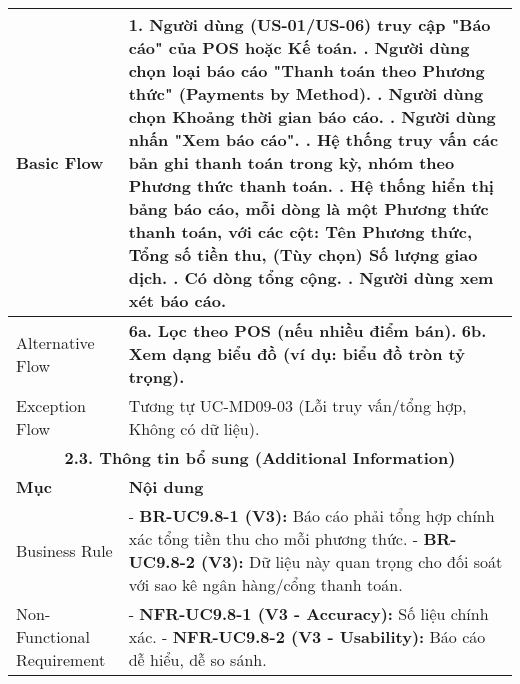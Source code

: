 \begin{longtable}{|m{4cm}|p{11cm}|}
Basic Flow & 1. Người dùng (US-01/US-06) truy cập "Báo cáo" của POS hoặc Kế toán. \newline 2. Người dùng chọn loại báo cáo "Thanh toán theo Phương thức" (Payments by Method). \newline 3. Người dùng chọn Khoảng thời gian báo cáo. \newline 4. Người dùng nhấn "Xem báo cáo". \newline 5. Hệ thống truy vấn các bản ghi thanh toán trong kỳ, nhóm theo Phương thức thanh toán. \newline 6. Hệ thống hiển thị bảng báo cáo, mỗi dòng là một Phương thức thanh toán, với các cột: Tên Phương thức, Tổng số tiền thu, (Tùy chọn) Số lượng giao dịch. \newline 7. Có dòng tổng cộng. \newline 8. Người dùng xem xét báo cáo. \\
\hline
Alternative Flow & \textbf{6a. Lọc theo POS (nếu nhiều điểm bán).} \newline \textbf{6b. Xem dạng biểu đồ (ví dụ: biểu đồ tròn tỷ trọng). } \\
\hline
Exception Flow & Tương tự UC-MD09-03 (Lỗi truy vấn/tổng hợp, Không có dữ liệu). \\
\hline
\multicolumn{2}{|c|}{\textbf{2.3. Thông tin bổ sung (Additional Information)}} \\
\hline
\textbf{Mục} & \textbf{Nội dung} \\
\hline
Business Rule & - \textbf{BR-UC9.8-1 (V3):} Báo cáo phải tổng hợp chính xác tổng tiền thu cho mỗi phương thức. \newline - \textbf{BR-UC9.8-2 (V3):} Dữ liệu này quan trọng cho đối soát với sao kê ngân hàng/cổng thanh toán. \\
\hline
Non-Functional Requirement & - \textbf{NFR-UC9.8-1 (V3 - Accuracy):} Số liệu chính xác. \newline - \textbf{NFR-UC9.8-2 (V3 - Usability):} Báo cáo dễ hiểu, dễ so sánh. \\
\hline
\end{longtable}

